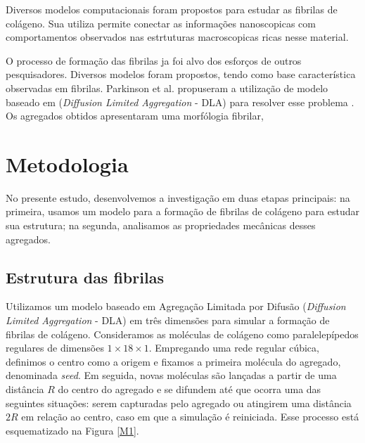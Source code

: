 \documentclass{article}
\begin{document}
    Diversos modelos computacionais foram propostos para estudar as fibrilas de colágeno. Sua utiliza permite conectar as informações
    nanoscopicas com comportamentos observados nas estrtuturas macroscopicas ricas nesse material. 
    

    O processo de formação das fibrilas ja foi alvo dos esforços de outros pesquisadores. Diversos modelos foram propostos, 
    tendo como base característica observadas em fibrilas. Parkinson et al. propuseram a utilização de modelo baseado em 
    (\textit{Diffusion Limited Aggregation} - DLA) para resolver esse problema \cite{Parkinson1995}. Os agregados obtidos
    apresentaram uma morfólogia fibrilar,  


\section{Metodologia}

    No presente estudo, desenvolvemos a investigação em duas etapas principais: na primeira, usamos um modelo para a formação de 
    fibrilas de colágeno para estudar sua estrutura; na segunda, analisamos as propriedades mecânicas desses agregados. 

    \subsection{Estrutura das fibrilas}

    Utilizamos um modelo baseado em Agregação Limitada por Difusão (\textit{Diffusion Limited Aggregation} - DLA) \cite{Witten1983} 
    em três dimensões para simular a formação de fibrilas de colágeno. Consideramos as moléculas de colágeno como paralelepípedos 
    regulares de dimensões \(1 \times 18 \times 1\). Empregando uma rede regular cúbica, definimos o centro como a origem e fixamos 
    a primeira molécula do agregado, denominada \textit{seed}. Em seguida, novas moléculas são lançadas a partir de uma distância 
    \(R\) do centro do agregado e se difundem até que ocorra uma das seguintes situações: serem capturadas pelo agregado ou atingirem 
    uma distância \(2R\) em relação ao centro, caso em que a simulação é reiniciada. Esse processo está esquematizado na Figura \ref{M1}. 
\end{document}
